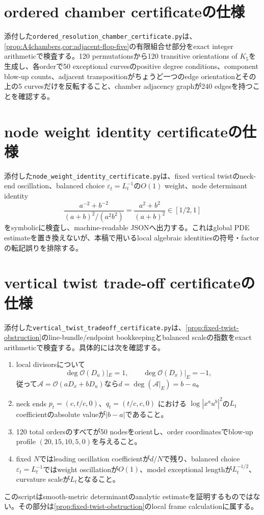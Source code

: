 \documentclass[11pt,a4paper]{ltjsarticle}
\theoremstyle{definition}
\theoremstyle{remark}
\newcommand{\eps}{\varepsilon}
\begin{document}
\section{ordered chamber certificateの仕様}

添付した\texttt{ordered\_resolution\_chamber\_certificate.py}は、\cref{prop:A4chambers,cor:adjacent-flop-five}の有限組合せ部分をexact integer arithmeticで検査する。120 permutationsから120 transitive orientations of $K_5$を生成し、各orderで50 exceptional curvesのpositive degree conditions、component blow-up counts、adjacent transpositionがちょうど一つのedge orientationとその上の5 curvesだけを反転すること、chamber adjacency graphが240 edgesを持つことを確認する。

\section{node weight identity certificateの仕様}

添付した\texttt{node\_weight\_identity\_certificate.py}は、fixed vertical twistのneck-end oscillation、balanced choice $\eps_t=L_t^{-1}$の$O(1)$ weight、node determinant identity
\[
 \frac{a^{-2}+b^{-2}}{(a+b)^2/(a^2b^2)}
 =\frac{a^2+b^2}{(a+b)^2}\in[1/2,1]
\]
をsymbolicに検査し、machine-readable JSONへ出力する。これはglobal PDE estimateを置き換えないが、本稿で用いるlocal algebraic identitiesの符号・factorの転記誤りを排除する。

\section{vertical twist trade-off certificateの仕様}

添付した\texttt{vertical\_twist\_tradeoff\_certificate.py}は、\cref{prop:fixed-twist-obstruction}のline-bundle/endpoint bookkeepingとbalanced scaleの指数をexact arithmeticで検査する。具体的には次を確認する。
\begin{enumerate}[leftmargin=2.5em]
\item local divisorsについて
\[
 \deg\mathcal O(D_u)|_E=1,\qquad
 \deg\mathcal O(D_x)|_E=-1,
\]
従って$\mathcal A=\mathcal O(aD_x+bD_u)$なら$d=\deg(\mathcal A|_E)=b-a$。
\item neck ends $p_t=(c,t/c,0)$、$q_t=(t/c,c,0)$ における
$\log|x^au^b|^2$の$L_t$ coefficientのabsolute valueが$|b-a|$であること。
\item 120 total ordersのすべてが50 nodesをorientし、order coordinatesでblow-up profile $(20,15,10,5,0)$を与えること。
\item fixed $N$ではleading oscillation coefficientが$d/N$で残り、balanced choice$\eps_t=L_t^{-1}$ではweight oscillationが$O(1)$、model exceptional lengthが$L_t^{-1/2}$、curvature scaleが$L_t$となること。
\end{enumerate}
このscriptはsmooth-metric determinantのanalytic estimateを証明するものではない。その部分は\cref{prop:fixed-twist-obstruction}のlocal frame calculationに属する。
\end{document}
